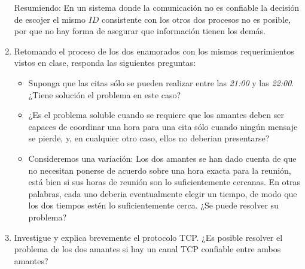 \documentclass[8pt, letterpaper]{article}
\begin{document}
\begin{enumerate}
  Resumiendo: En un sistema donde la comunicación no es confiable la decisión
  de escojer el mismo $ID$ consistente con los otros dos procesos no es
  posible, por que no hay forma de asegurar que información tienen los demás.
  \rmfamily
  \newpage

\item  Retomando el proceso de los dos enamorados con los mismos requerimientos
  vistos en clase, responda las siguientes preguntas:
  \begin{itemize}
  \item Suponga que las citas sólo se pueden realizar entre las \textit{21:00}
    y las \textit{22:00}. ¿Tiene solución el problema en este caso?
  \item ¿Es el problema soluble cuando se requiere que los amantes deben
    ser capaces de coordinar una hora para una cita sólo cuando ningún mensaje
    se pierde, y, en cualquier otro caso, ellos no deberian presentarse?
  \item Consideremos una variación: Los dos amantes se han dado cuenta de que no
    necesitan ponerse de acuerdo sobre una hora exacta para la reunión, está
    bien si sus horas de reunión son lo suficientemente cercanas.
    En otras palabras, cada uno deberia eventualmente elegir un tiempo,
    de modo que los dos tiempos estén lo suficientemente cerca. ¿Se puede
    resolver su problema?
  \end{itemize}
  \ttfamily
  \rmfamily
\item Investigue y explica brevemente el protocolo TCP. ¿Es posible resolver
  el problema de los dos amantes si hay un canal TCP confiable entre ambos
  amantes?
  \ttfamily
  
  \end{enumerate}
\end{document}
